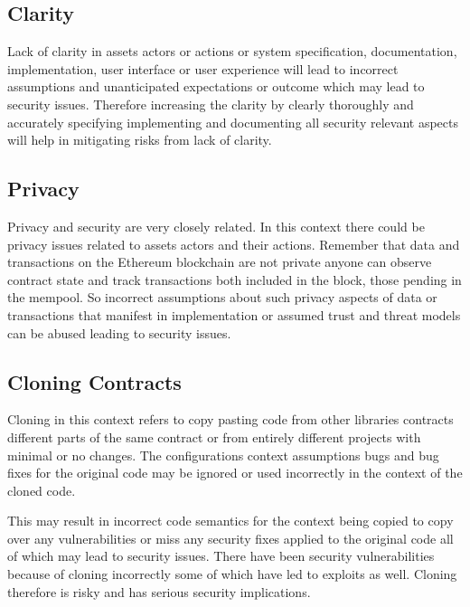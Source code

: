 \subsection{Clarity}\label{clarity-1}

Lack of clarity in assets actors or actions or system specification,
documentation, implementation, user interface or user experience will
lead to incorrect assumptions and unanticipated expectations or outcome
which may lead to security issues. Therefore increasing the clarity by
clearly thoroughly and accurately specifying implementing and
documenting all security relevant aspects will help in mitigating risks
from lack of clarity.

\subsection{Privacy}\label{privacy-1}

Privacy and security are very closely related. In this context there
could be privacy issues related to assets actors and their actions.
Remember that data and transactions on the Ethereum blockchain are not
private anyone can observe contract state and track transactions both
included in the block, those pending in the mempool. So incorrect
assumptions about such privacy aspects of data or transactions that
manifest in implementation or assumed trust and threat models can be
abused leading to security issues.

\subsection{Cloning Contracts}\label{cloning-contracts}

Cloning in this context refers to copy pasting code from other libraries
contracts different parts of the same contract or from entirely
different projects with minimal or no changes. The configurations
context assumptions bugs and bug fixes for the original code may be
ignored or used incorrectly in the context of the cloned code.

This may result in incorrect code semantics for the context being copied
to copy over any vulnerabilities or miss any security fixes applied to
the original code all of which may lead to security issues. There have
been security vulnerabilities because of cloning incorrectly some of
which have led to exploits as well. Cloning therefore is risky and has
serious security implications.
